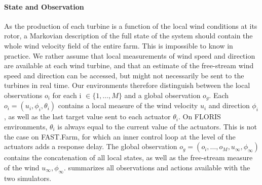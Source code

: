 \documentclass{article}
\newcommand{\jz}[1]{{\color{blue}#1}}
\newcommand{\md}[1]{{\color{red}#1}}
\begin{document}
\paragraph{State and Observation} 
As the production of each turbine is a function of the local wind conditions at its rotor, a Markovian description of the full state of the system should contain the whole wind velocity field of the entire farm. This is impossible to know in practice.
We rather assume that local measurements of wind speed and direction are available at each wind turbine, and that an estimate of the free-stream wind speed and direction can be accessed, but might not necessarily be sent to the turbines in real time. 
Our environments therefore distinguish between the local observations $o_i$ for each i $ \in \{1, \dots, M\}$ and a global observation $o_g$. 
Each $o_i = (u_i, \phi_i, \theta_i)$ contains a local measure of the wind velocity $u_i$ and direction $\phi_i$, as well as the last target value sent to each actuator $\theta_i$. On FLORIS environments, $\theta_i$ is always equal to the current value of the actuators. This is not the case on FAST.Farm, for which an inner control loop at the level of the actuators adds a response delay. The global observation $o_g = (o_i, \dots, o_M, u_\infty, \phi_\infty)$ contains the concatenation of all local states, as well as the free-stream measure of the wind $u_{\infty}, \phi_{\infty}$.  summarizes all observations and actions available with the two simulators.
%
\end{document}
